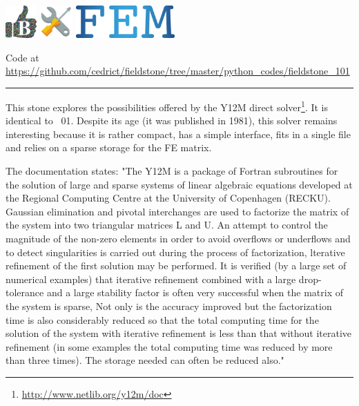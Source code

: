\includegraphics[height=1.25cm]{images/pictograms/benchmark}
\includegraphics[height=1.25cm]{images/pictograms/tools}
\includegraphics[height=1.25cm]{images/pictograms/FEM}




\begin{center}
Code at \url{https://github.com/cedrict/fieldstone/tree/master/python_codes/fieldstone_101}
\end{center}

\par\noindent\rule{\textwidth}{0.4pt}


This stone explores the possibilities offered by the Y12M direct solver\footnote{
\url{http://www.netlib.org/y12m/doc}}. It is identical 
to \stone~01. Despite its age (it was published in 1981), 
this solver remains interesting because it is rather compact, has a simple interface, fits in 
a single file and relies on a sparse storage for the FE matrix.

The documentation \cite{zlws81} states:
"The Y12M is a package of Fortran subroutines for the solution of large and sparse systems of
linear algebraic equations developed at the Regional Computing Centre at the University of
Copenhagen (RECKU). Gaussian elimination and pivotal interchanges are used to factorize
the matrix of the system into two triangular matrices L and U. An attempt to control the
magnitude of the non-zero elements in order to avoid overflows or underflows and to detect
singularities is carried out during the process of factorization, lterative refinement of the first
solution may be performed. It is verified (by a large set of numerical examples) that iterative
refinement combined with a large drop-tolerance and a large stability factor is often very
successful when the matrix of the system is sparse, Not only is the accuracy improved but
the factorization time is also considerably reduced so that the total computing time for the
solution of the system with iterative refinement is less than that without iterative refinement
(in some examples the total computing time was reduced by more than three times). The
storage needed can often be reduced also."

